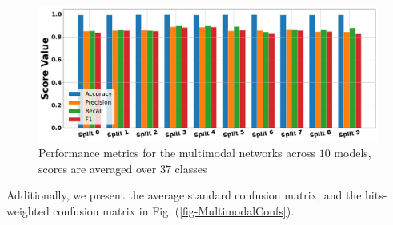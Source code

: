 \documentclass[12pt,letterpaper]{article}
\begin{document}
\begin{figure}[H]
\begin{center}
\includegraphics[scale=0.3]{../FiguresMetrics/AvgXval-Multimodal}
\caption{Performance metrics for the multimodal networks across $10$ models, scores are averaged over $37$ classes}
\label{fig-MultimodalXval}
\end{center}
\end{figure}
Additionally, we present the average standard confusion matrix, and the hits-weighted confusion matrix in Fig. (\ref{fig-MultimodalConfs}).
\end{document}
